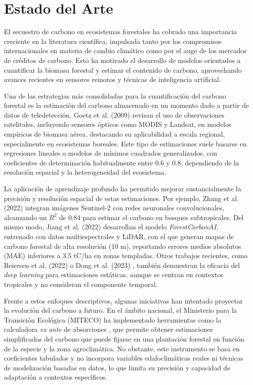 \section{Estado del Arte}
\label{sec:estado-del-arte}

El secuestro de carbono en ecosistemas forestales ha cobrado una importancia creciente en la literatura científica, impulsada tanto por los compromisos internacionales en materia de cambio climático como por el auge de los mercados de créditos de carbono. Esto ha motivado el desarrollo de modelos orientados a cuantificar la biomasa forestal y estimar el contenido de carbono, aprovechando avances recientes en sensores remotos y técnicas de inteligencia artificial.


Una de las estrategias más consolidadas para la cuantificación del carbono forestal es la estimación del carbono almacenado en un momento dado a partir de datos de teledetección. Goetz et al. (2009) \cite{goetz2009remote} revisan el uso de observaciones satelitales, incluyendo sensores ópticos como MODIS y Landsat, en modelos empíricos de biomasa aérea, destacando su aplicabilidad a escala regional, especialmente en ecosistemas boreales. Este tipo de estimaciones suele basarse en regresiones lineales o modelos de mínimos cuadrados generalizados, con coeficientes de determinación habitualmente entre 0.6 y 0.8, dependiendo de la resolución espacial y la heterogeneidad del ecosistema.

La aplicación de aprendizaje profundo ha permitido mejorar sustancialmente la precisión y resolución espacial de estas estimaciones. Por ejemplo, Zhang et al. (2022) \cite{zhang2022carbon} integran imágenes Sentinel-2 con redes neuronales convolucionales, alcanzando un \(R^2\) de 0.84 para estimar el carbono en bosques subtropicales. Del mismo modo, Jiang et al. (2022) \cite{jiang2022integrating} desarrollan el modelo \textit{ForestCarbonAI}, entrenado con datos multiespectrales y LiDAR, con el que generan mapas de carbono forestal de alta resolución (10 m), reportando errores medios absolutos (MAE) inferiores a 3.5 tC/ha en zonas templadas. Otros trabajos recientes, como Reiersen et al. (2022) \cite{reiersen2022reforestree} o Dong et al. (2023) \cite{dong2023forest}, también demuestran la eficacia del \textit{deep learning} para estimaciones estáticas, aunque se centran en contextos tropicales y no consideran el componente temporal.


Frente a estos enfoques descriptivos, algunas iniciativas han intentado proyectar la evolución del carbono a futuro. En el ámbito nacional, el Ministerio para la Transición Ecológica (MITECO) ha implementado herramientas como la calculadora \textit{ex ante} de absorciones \cite{miteco_abexante_2025}, que permite obtener estimaciones simplificadas del carbono que puede fijarse en una plantación forestal en función de la especie y la zona agroclimática. No obstante, este instrumento se basa en coeficientes tabulados y no incorpora variables edafoclimáticas reales ni técnicas de modelización basadas en datos, lo que limita su precisión y capacidad de adaptación a contextos específicos.

